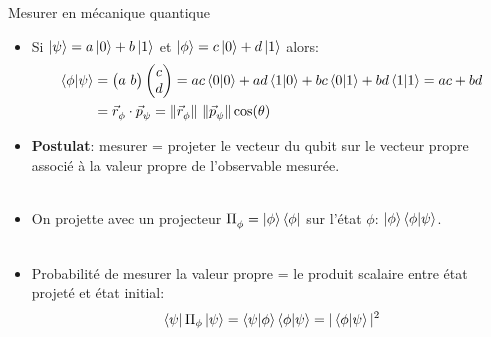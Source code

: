 \documentclass[aspectratio=169,12pt]{beamer}
\begin{document}
\begin{frame}{Mesurer en mécanique quantique}
  \begin{itemize}[<+->]
    \item Si $\ket \psi = a \ket 0 + b \ket 1$ et $\ket \phi = c \ket 0 + d \ket 1$ alors:
    \begin{equation*}
      \begin{split}
        \braket{\phi|\psi}
        &= \begin{pmatrix}
          a\  b
        \end{pmatrix}
        \begin{pmatrix}
          c\\d
        \end{pmatrix} = ac \braket{0|0} + ad \braket{1|0} + bc \braket{0|1} + bd \braket{1|1} = ac +bd\\
        &= \vec r_\phi^{} \cdot \vec p_\psi^{} = \|\vec r_\phi^{}\|\ \|\vec p_\psi^{}\| \cos(\theta)
      \end{split}
    \end{equation*}
    \item \textbf{Postulat}: mesurer = projeter le vecteur du qubit sur le vecteur propre associé à la
     valeur propre de l'observable mesurée.\\~\\
    \item On projette avec un projecteur $\Pi_{\phi}^{} = \ket \phi \bra \phi$ sur l'état $\phi$: $\ket \phi \braket{\phi|\psi}$.\\~\\
    \item Probabilité de mesurer la valeur propre = le produit scalaire entre état projeté et état initial: 
    $$ \bra \psi \Pi_\phi \ket \psi = \braket{\psi|\phi}\braket{\phi|\psi} = |\braket{\phi|\psi}|^2 $$
  \end{itemize}  
\end{frame}
\end{document}
